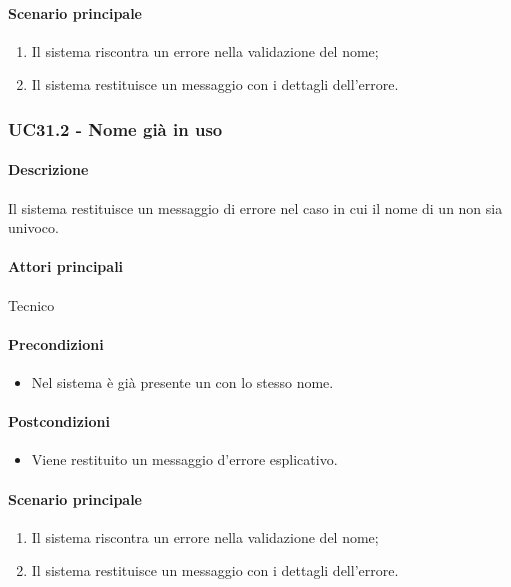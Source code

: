 \paragraph*{Scenario principale}
\begin{enumerate}
  \item Il sistema riscontra un errore nella validazione del nome;
  \item Il sistema restituisce un messaggio con i dettagli dell'errore.  
\end{enumerate}


\subsubsection{UC31.2 - Nome già in uso}\label{UC31point2}
\paragraph*{Descrizione}
Il sistema restituisce un messaggio di errore nel caso in cui il nome di un  non sia univoco.

\paragraph*{Attori principali}
Tecnico

\paragraph*{Precondizioni}
\begin{itemize}
  \item Nel sistema è già presente un  con lo stesso nome.
\end{itemize}

\paragraph*{Postcondizioni}
\begin{itemize}
  \item Viene restituito un messaggio d'errore esplicativo.
\end{itemize}

\paragraph*{Scenario principale}
\begin{enumerate}
  \item Il sistema riscontra un errore nella validazione del nome;
  \item Il sistema restituisce un messaggio con i dettagli dell'errore.  
\end{enumerate}
